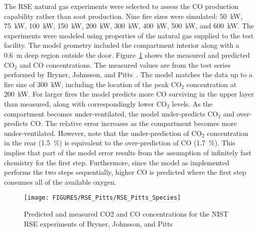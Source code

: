 The RSE natural gas experiments were selected to assess the CO production capability rather than soot production. 
Nine fire sizes were simulated: 50~kW, 75~kW, 100~kW, 150~kW, 200~kW, 300~kW, 400~kW,
500~kW, and 600~kW.  The experiments were modeled using properties of the natural gas supplied to the test facility.
The model geometry included the compartment interior along with a 0.6~m deep region outside the door.
Figure~\ref{RSE_Pitts_Species} shows the measured and predicted CO$_2$ and CO concentrations.  The measured values are
from the test series performed by Bryner, Johnsson, and Pitts~\cite{Bryner:1}.  The model matches the data up to a fire size of
300~kW, including the location of the peak CO$_2$ concentration at 200~kW.  For larger fires the model predicts more
CO surviving in the upper layer than measured, along with correspondingly lower CO$_2$ levels.  
As the compartment becomes under-ventilated, the model under-predicts
CO$_2$ and over-predicts CO. The relative error increases as the compartment becomes more under-ventilated.  However,
note that the under-prediction of CO$_2$ concentration in the rear (1.5~\%) is equivalent to the
over-prediction of CO (1.7~\%).  This implies that part of the model error results from the assumption of
infinitely fast chemistry for the first step.  Furthermore, since the model as implemented performs the two steps
sequentially, higher CO is predicted where the first step consumes all of the available oxygen.

\begin{figure}
\texttt{[image: FIGURES/RSE\_Pitts/RSE\_Pitts\_Species]}
\caption{Predicted and measured CO2 and CO concentrations for the NIST RSE experiments of Bryner, Johnsson, and Pitts}
\label{RSE_Pitts_Species}
\end{figure}
